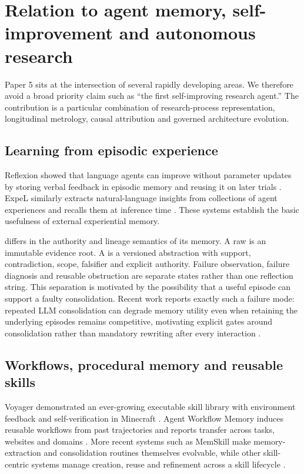 \section{Relation to agent memory, self-improvement and autonomous research}
\label{sec:related}

Paper 5 sits at the intersection of several rapidly developing areas. We therefore avoid a broad priority claim such as ``the first self-improving research agent.'' The contribution is a particular combination of research-process representation, longitudinal metrology, causal attribution and governed architecture evolution.

\subsection{Learning from episodic experience}

Reflexion showed that language agents can improve without parameter updates by storing verbal feedback in episodic memory and reusing it on later trials \cite{shinn2023reflexion}. ExpeL similarly extracts natural-language insights from collections of agent experiences and recalls them at inference time \cite{zhao2023expel}. These systems establish the basic usefulness of external experiential memory.

\RAKL{} differs in the authority and lineage semantics of its memory. A raw \TaskEpisode{} is an immutable evidence root. A \Lesson{} is a versioned abstraction with support, contradiction, scope, falsifier and explicit authority. Failure observation, failure diagnosis and reusable obstruction are separate states rather than one reflection string. This separation is motivated by the possibility that a useful episode can support a faulty consolidation. Recent work reports exactly such a failure mode: repeated LLM consolidation can degrade memory utility even when retaining the underlying episodes remains competitive, motivating explicit gates around consolidation rather than mandatory rewriting after every interaction \cite{zhang2026faultymemory}.

\subsection{Workflows, procedural memory and reusable skills}

Voyager demonstrated an ever-growing executable skill library with environment feedback and self-verification in Minecraft \cite{wang2023voyager}. Agent Workflow Memory induces reusable workflows from past trajectories and reports transfer across tasks, websites and domains \cite{wang2024awm}. More recent systems such as MemSkill make memory-extraction and consolidation routines themselves evolvable, while other skill-centric systems manage creation, reuse and refinement across a skill lifecycle \cite{zhang2026memskill,lin2026muse}.

